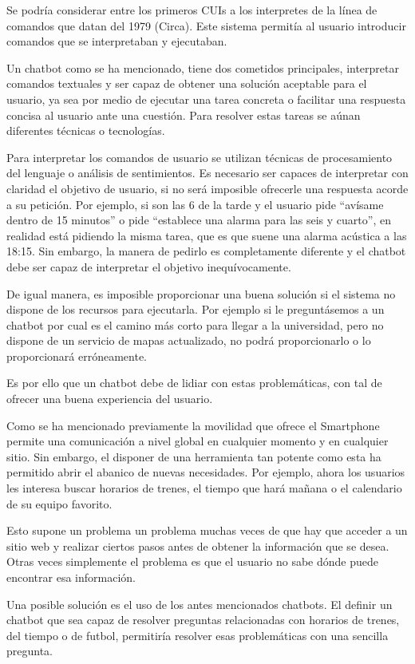 Se podría considerar entre los primeros CUIs a los interpretes de la línea de comandos que datan del 1979 (Circa). Este sistema permitía al usuario introducir comandos que se interpretaban y ejecutaban. 

Un chatbot como se ha mencionado, tiene dos cometidos principales, interpretar comandos textuales y ser capaz de obtener una solución aceptable para el usuario, ya sea por medio de ejecutar una tarea concreta o facilitar una respuesta concisa al usuario ante una cuestión. Para resolver estas tareas se aúnan diferentes técnicas o tecnologías.

Para interpretar los comandos de usuario se utilizan técnicas de procesamiento del lenguaje o análisis de sentimientos. Es necesario ser capaces de interpretar con claridad el objetivo de usuario, si no será imposible ofrecerle una respuesta acorde a su petición. Por ejemplo, si son las 6 de la tarde y el usuario pide “avísame dentro de 15 minutos” o pide “establece una alarma para las seis y cuarto”, en realidad está pidiendo la misma tarea, que es que suene una alarma acústica a las 18:15. Sin embargo, la manera de pedirlo es completamente diferente y el chatbot debe ser capaz de interpretar el objetivo inequívocamente.

De igual manera, es imposible proporcionar una buena solución si el sistema no dispone de los recursos para ejecutarla. Por ejemplo si le preguntásemos a un chatbot por cual es el camino más corto para llegar a la universidad, pero no dispone de un servicio de mapas actualizado, no podrá proporcionarlo o lo proporcionará erróneamente.

Es por ello que un chatbot debe de lidiar con estas problemáticas, con tal de ofrecer una buena experiencia del usuario.

Como se ha mencionado previamente la movilidad que ofrece el Smartphone permite una comunicación a nivel global en cualquier momento y en cualquier sitio. Sin embargo, el disponer de una herramienta tan potente como esta ha permitido abrir el abanico de nuevas necesidades. Por ejemplo, ahora los usuarios les interesa buscar horarios de trenes, el tiempo que hará mañana o el calendario de su equipo favorito.

Esto supone un problema un problema muchas veces de que hay que acceder a un sitio web y realizar ciertos pasos antes de obtener la información que se desea. Otras veces simplemente el problema es que el usuario no sabe dónde puede encontrar esa información.

Una posible solución es el uso de los antes mencionados chatbots. El definir un chatbot que sea capaz de resolver preguntas relacionadas con horarios de trenes, del tiempo o de futbol, permitiría resolver esas problemáticas con una sencilla pregunta.

